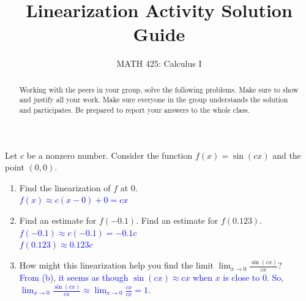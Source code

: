 \documentclass{ximera}
\title{Linearization Activity Solution Guide}
\author{MATH 425: Calculus I}
\begin{document}
\begin{abstract}
   Working with the peers in your group, solve the following problems. Make sure to show and justify all your work. Make sure everyone in the group understands the solution and participates. Be prepared to report your answers to the whole class. 
\end{abstract}
\maketitle


\begin{exercise}
   Let $c$ be a nonzero number. Consider the function $f(x)=\sin(cx)$ and the point $(0,0)$. \begin{enumerate}
      \item Find the linearization of $f$ at $0$.\\
        \textcolor{blue}{ $f(x)\approx c(x-0)+0=cx$}
        
        \item Find an estimate for $f(-0.1)$. Find an estimate for $f(0.123)$.\\
        \textcolor{blue}{ $f(-0.1)\approx c(-0.1)=-0.1c$\\
        $f(0.123)\approx 0.123c$}
        
        \item How might this linearization help you find the limit $\lim_{x\to 0}\frac{\sin(cx)}{cx}$?\\
        \textcolor{blue}{From (b), it seems as though $\sin(cx)\approx cx$ when $x$ is close to $0$. So, $\lim_{x\to 0}\frac{\sin(cx)}{cx}\approx \lim_{x\to 0}\frac{cx}{cx}=1$.}
   \end{enumerate}
\end{exercise}
 
\end{document}
